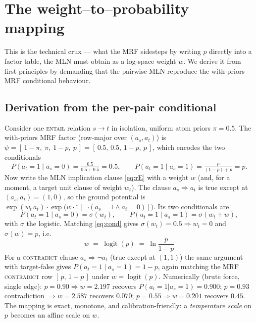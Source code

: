 \documentclass[11pt]{article}
\newcommand{\Ent}{\textsc{entail}}
\newcommand{\Con}{\textsc{contradict}}
\begin{document}
\section{The weight--to--probability mapping}
\label{sec:weights}

This is the technical crux --- what the MRF sidesteps by writing $p$ directly into a factor
table, the MLN must obtain as a log-space weight $w$. We derive it from first principles by
demanding that the pairwise MLN reproduce the with-priors MRF conditional behaviour.

\subsection{Derivation from the per-pair conditional}
Consider one \Ent{} relation $s\!\to\!t$ in isolation, uniform atom priors $\pi{=}0.5$. The
with-priors MRF factor (row-major over $(a_s,a_t)$) is
$\psi=[\,1{-}\pi,\ \pi,\ 1{-}p,\ p\,]=[\,0.5,\,0.5,\,1{-}p,\,p\,]$, which encodes the two
conditionals
\begin{equation}
  P(a_t{=}1\mid a_s{=}0)=\tfrac{0.5}{0.5+0.5}=0.5,
  \qquad
  P(a_t{=}1\mid a_s{=}1)=\tfrac{p}{(1-p)+p}=p .
  \label{eq:cond}
\end{equation}
Now write the MLN implication clause \eqref{eq:rE} with a weight $w$ (and, for a moment, a
target unit clause of weight $w_t$). The clause $a_s\Rightarrow a_t$ is true except at
$(a_s,a_t)=(1,0)$, so the ground potential is
$\exp(w_t\,a_t)\cdot\exp\!\big(w\cdot\mathbb 1[\neg(a_s{=}1\wedge a_t{=}0)]\big)$. Its two
conditionals are
\[
  P(a_t{=}1\mid a_s{=}0)=\sigma(w_t),
  \qquad
  P(a_t{=}1\mid a_s{=}1)=\sigma(w_t+w),
\]
with $\sigma$ the logistic. Matching \eqref{eq:cond} gives $\sigma(w_t)=0.5\Rightarrow w_t=0$
and $\sigma(w)=p$, i.e.
\begin{equation}
  \boxed{\ \ w \;=\; \operatorname{logit}(p)\;=\;\ln\frac{p}{1-p}\ \ }
  \label{eq:wmap}
\end{equation}
For a \Con{} clause $a_s\Rightarrow\neg a_t$ (true except at $(1,1)$) the same argument with
target-false gives $P(a_t{=}1\mid a_s{=}1)=1-p$, again matching the MRF \Con{} row
$[\,p,\,1{-}p\,]$ under $w=\operatorname{logit}(p)$. Numerically (brute force, single edge):
$p{=}0.90\Rightarrow w{=}2.197$ recovers $P(a_t{=}1|a_s{=}1)=0.900$; $p{=}0.93$ contradiction
$\Rightarrow w{=}2.587$ recovers $0.070$; $p{=}0.55\Rightarrow w{=}0.201$ recovers $0.45$.
The mapping is exact, monotone, and calibration-friendly: a \emph{temperature scale} on $p$
becomes an affine scale on $w$.
\end{document}
